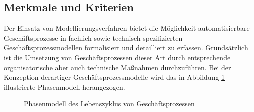 \subsection{Merkmale und Kriterien}

Der Einsatz von Modellierungsverfahren bietet die Möglichkeit automatisierbare Geschäftsprozesse in fachlich sowie technisch spezifizierten Geschäftsprozessmodellen formalisiert und detailliert zu erfassen.
Grundsätzlich ist die Umsetzung von Geschäftsprozessen dieser Art durch entsprechende organisatorische aber auch technische Maßnahmen durchzuführen.
Bei der Konzeption derartiger Geschäftsprozessmodelle wird das in Abbildung \ref{fig:Phasenmodell bei der Automatisierung von Geschäftsprozessen} illustrierte Phasenmodell herangezogen.

\begin{figure}[H]
	\centering 
    \caption[Phasenmodell bei der Automatisierung von Geschäftsprozessen]
    {Phasenmodell des Lebenszyklus von Geschäftsprozessen \protect\footnotemark}
    \label{fig:Phasenmodell bei der Automatisierung von Geschäftsprozessen}
\end{figure}

